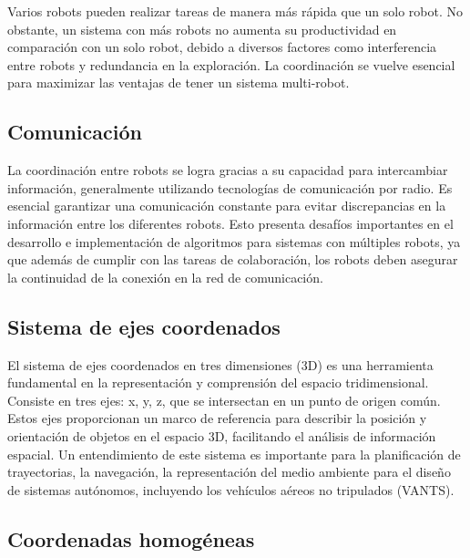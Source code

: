 Varios robots pueden realizar tareas de manera más rápida que un solo robot. No obstante, un sistema con más robots no aumenta su productividad en comparación con un solo robot, debido a diversos factores como interferencia entre robots y redundancia en la exploración. La coordinación se vuelve esencial para maximizar las ventajas de tener un sistema multi-robot.

\subsection*{Comunicación}

La coordinación entre robots se logra gracias a su capacidad para intercambiar información, generalmente utilizando tecnologías de comunicación por radio. Es esencial garantizar una comunicación constante para evitar discrepancias en la información entre los diferentes robots. Esto presenta desafíos importantes en el desarrollo e implementación de algoritmos para sistemas con múltiples robots, ya que además de cumplir con las tareas de colaboración, los robots deben asegurar la continuidad de la conexión en la red de comunicación.


\subsection*{Sistema de ejes coordenados}

El sistema de ejes coordenados en tres dimensiones (3D) es una herramienta fundamental en la representación y comprensión del espacio tridimensional. Consiste en tres ejes: x, y, z, que se intersectan en un punto de origen común. Estos ejes proporcionan un marco de referencia para describir la posición y orientación de objetos en el espacio 3D, facilitando el análisis de información espacial. Un entendimiento de este sistema es importante para la planificación de trayectorias, la navegación, la representación del medio ambiente para el diseño de sistemas autónomos, incluyendo los vehículos aéreos no tripulados (VANTS).


\subsection*{Coordenadas homogéneas}

